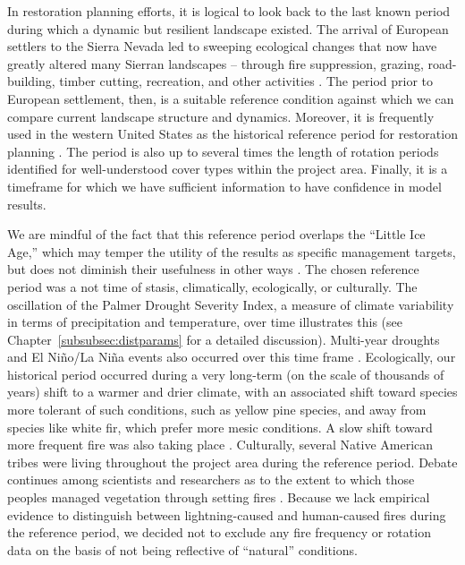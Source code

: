 In restoration planning efforts, it is logical to look back to the last known period during which a dynamic but resilient landscape existed. The arrival of European settlers to the Sierra Nevada led to sweeping ecological changes that now have greatly altered many Sierran landscapes -- through fire suppression, grazing, road-building, timber cutting, recreation, and other activities \citep{Storer1963,Stephens2015,Knapp2013,Hessburg2005}.  The period prior to European settlement, then, is a suitable reference condition against which we can compare current landscape structure and dynamics. Moreover, it is frequently used in the western United States as the historical reference period for restoration planning \citep{VandeWater2011,Safford2013,Meyer2013}. The period is also up to several times the length of rotation periods identified for well-understood cover types within the project area. Finally, it is a timeframe for which we have sufficient information to have confidence in model results. 

We are mindful of the fact that this reference period overlaps the ``Little Ice Age,'' which may temper the utility of the results as specific management targets, but does not diminish their usefulness in other ways \citep{Minnich2007,Safford2013}. The chosen reference period was a not time of stasis, climatically, ecologically, or culturally. The oscillation of the Palmer Drought Severity Index, a measure of climate variability in terms of precipitation and temperature, over time illustrates this (see Chapter~\ref{subsubsec:distparams} for a detailed discussion). Multi-year droughts and El Ni\~no/La Ni\~na events also occurred over this time frame \citep{Minnich2007}. Ecologically, our historical period occurred during a very long-term (on the scale of thousands of years) shift to a warmer and drier climate, with an associated shift toward species more tolerant of such conditions, such as yellow pine species, and away from species like white fir, which prefer more mesic conditions. A slow shift toward more frequent fire was also taking place \citep{Safford2013}. Culturally, several Native American tribes were living throughout the project area during the reference period. Debate continues among scientists and researchers as to the extent to which those peoples managed vegetation through setting fires \citep{Safford2013}. Because we lack empirical evidence to distinguish between lightning-caused and human-caused fires during the reference period, we decided not to exclude any fire frequency or rotation data on the basis of not being reflective of ``natural'' conditions. 

